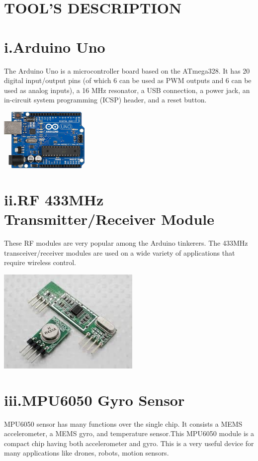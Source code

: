 \documentclass[12pt]{article}
\begin{document}
\section{TOOL'S DESCRIPTION}
\section*{i.Arduino Uno}
The Arduino Uno is a microcontroller board based on the ATmega328. It has 20 digital input/output pins (of which 6 can be used as PWM outputs and 6 can be used as analog inputs), a 16 MHz resonator, a USB connection, a power jack, an in-circuit system programming (ICSP) header, and a reset button.

\includegraphics[height=3cm]{ar.jpg}

\section*{ii.RF 433MHz Transmitter/Receiver Module}
These RF modules are very popular among the Arduino tinkerers. The 433MHz transceiver/receiver modules are used on a wide variety of applications that require wireless control.

\includegraphics[height=5cm]{download.jpg}
\pagebreak
\section*{iii.MPU6050 Gyro Sensor}
MPU6050 sensor has many functions over the single chip. It consists a MEMS accelerometer, a MEMS gyro, and temperature sensor.This MPU6050 module is a compact chip having both accelerometer and gyro. This is a very useful device for many applications like drones, robots, motion sensors.
\end{document}
